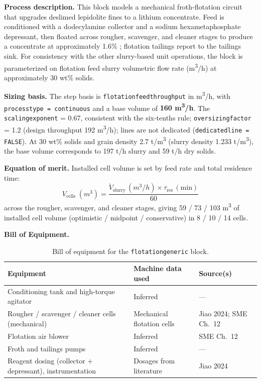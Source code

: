 \documentclass{article}
\renewcommand\_{\textunderscore\allowbreak}
\begin{document}
\medskip
\noindent\textbf{Process description.}\quad
This block models a mechanical froth-flotation circuit that upgrades deslimed lepidolite fines to a lithium concentrate. Feed is conditioned with a dodecylamine collector and a sodium hexametaphosphate depressant, then floated across rougher, scavenger, and cleaner stages to produce a concentrate at approximately 1.6\% ; flotation tailings report to the tailings sink. For consistency with the other slurry-based unit operations, the block is parameterized on flotation feed slurry volumetric flow rate (\si{m^3/h}) at approximately 30 wt\% solids.
 
\medskip
\noindent\textbf{Sizing basis.}\quad
The step basis is \texttt{flotation\_feed\_throughput} in \si{m^3/h}, with \texttt{process\_type = continuous} and a base volume of \textbf{160 \si{m^3/h}}. The \texttt{scaling\_exponent} = 0.67, consistent with the six-tenths rule; \texttt{oversizing\_factor} = 1.2 (design throughput 192 \si{m^3/h}); lines are not dedicated (\texttt{dedicated\_line = FALSE}). At 30 wt\% solids and grain density 2.7 \si{t/m^3} (slurry density 1.233 \si{t/m^3}), the base volume corresponds to 197 t/h slurry and 59 t/h dry solids.
 
\medskip
\noindent\textbf{Equation of merit.}\quad
Installed cell volume is set by feed rate and total residence time:
\[
	V_{\text{cells}}\;(\si{m^3}) = \frac{\dot{V}_{\text{slurry}}\,(\si{m^3/h}) \times \tau_{\text{res}}\,(\text{min})}{60}
\]
across the rougher, scavenger, and cleaner stages, giving 59 / 73 / 103 \si{m^3} of installed cell volume (optimistic / midpoint / conservative) in 8 / 10 / 14 cells.
 
\medskip
\noindent\textbf{Bill of Equipment.}\quad
\begin{table}[h!]
\caption{Bill of equipment for the \texttt{flotation\_generic} block.}
\centering
\begin{tabular}{>{\raggedright\arraybackslash}p{5.2cm}
				>{\raggedright\arraybackslash}p{4cm}
				>{\raggedright\arraybackslash}p{4.5cm}}
\toprule
\textbf{Equipment} & \textbf{Machine data used} & \textbf{Source(s)} \\
\midrule
Conditioning tank and high-torque agitator & Inferred & --- \\
Rougher / scavenger / cleaner cells (mechanical) & Mechanical flotation cells & Jiao 2024; SME Ch.~12 \\
Flotation air blower & Inferred & SME Ch.~12 \\
Froth and tailings pumps & Inferred & --- \\
Reagent dosing (collector + depressant), instrumentation & Dosages from literature & Jiao 2024 \\
\bottomrule
\end{tabular}
\end{table}
 
\end{document}

